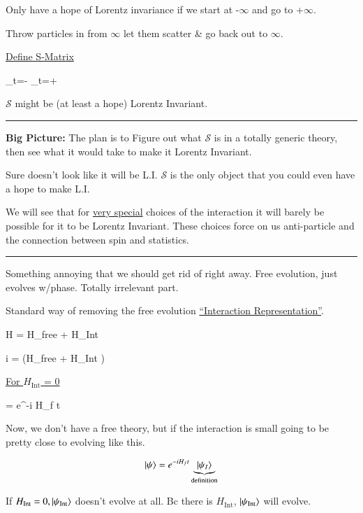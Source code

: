 {Only have a hope of Lorentz invariance if we start at -$\infty$ and go to +$\infty$.

Throw particles in from $\infty$ let them scatter \& go back out to $\infty$.

\underline{Define S-Matrix}

\be
{}_{t=-\infty} \rightarrow {}_{t=+\infty}
\ee

$\mathcal{S}$ might be (at least a hope) Lorentz Invariant.


\noindent\rule{\textwidth}{1pt}

\textbf{Big Picture:}
The plan is to Figure out what $\mathcal{S}$ is in a totally generic theory, then see what it would take to make it Lorentz Invariant. 

Sure doesn't look like it will be L.I. 
$\mathcal{S}$ is the only object that you could even have a hope to make L.I.

We will see that for \underline{very special} choices of the interaction it will barely be possible for it to be Lorentz Invariant. 
These choices force on us anti-particle and the connection between spin and statistics. 

\noindent\rule{\textwidth}{1pt}

Something annoying that we should get rid of right away. 
Free evolution, just evolves w/phase. Totally irrelevant part.


Standard way of removing the free evolution \underline{``Interaction Representation''}.

\be
H = H_\textrm{free} + H_\textrm{Int}
\ee


\be
i  = \left(H_\textrm{free} + H_\textrm{Int} \right) \ket{\psi} 
\ee

\underline{For $H_\textrm{Int}$ = 0}

\be
\ket{\psi} = e^{-i H_f t} 
\ee

Now, we don't have a free theory, but if the interaction is small going to be pretty close to evolving like this. 


\begin{equation}\label{eq:def}
\ket{\psi} = e^{-i H_f t} \underbrace{\ket{\psi_{I}}}_{\textrm{definition}}
\end{equation}

If $H_\textrm{Int} = 0, \ket{\psi_\textrm{Int}}$ doesn't evolve at all.
Bc there is $H_\textrm{Int}$, $\ket{\psi_\textrm{Int}}$ will evolve. 

}
